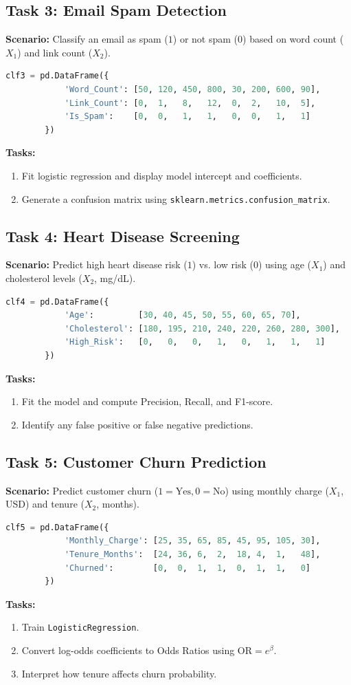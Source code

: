 \documentclass[11pt,a4paper]{article}
\begin{document}
	\subsection{Task 3: Email Spam Detection}
	\textbf{Scenario:} Classify an email as spam ($1$) or not spam ($0$) based on word count ($X_1$) and link count ($X_2$).
	\begin{lstlisting}[language=Python]
		clf3 = pd.DataFrame({
			'Word_Count': [50, 120, 450, 800, 30, 200, 600, 90],
			'Link_Count': [0,  1,   8,   12,  0,  2,   10,  5],
			'Is_Spam':    [0,  0,   1,   1,   0,  0,   1,   1]
		})
	\end{lstlisting}
	\textbf{Tasks:}
	\begin{enumerate}
		\item Fit logistic regression and display model intercept and coefficients.
		\item Generate a confusion matrix using \texttt{sklearn.metrics.confusion\_matrix}.
	\end{enumerate}
	
	\subsection{Task 4: Heart Disease Screening}
	\textbf{Scenario:} Predict high heart disease risk ($1$) vs. low risk ($0$) using age ($X_1$) and cholesterol levels ($X_2$, mg/dL).
	\begin{lstlisting}[language=Python]
		clf4 = pd.DataFrame({
			'Age':         [30, 40, 45, 50, 55, 60, 65, 70],
			'Cholesterol': [180, 195, 210, 240, 220, 260, 280, 300],
			'High_Risk':   [0,   0,   0,   1,   0,   1,   1,   1]
		})
	\end{lstlisting}
	\textbf{Tasks:}
	\begin{enumerate}
		\item Fit the model and compute Precision, Recall, and F1-score.
		\item Identify any false positive or false negative predictions.
	\end{enumerate}
	
	\subsection{Task 5: Customer Churn Prediction}
	\textbf{Scenario:} Predict customer churn ($1 = \text{Yes}, 0 = \text{No}$) using monthly charge ($X_1$, USD) and tenure ($X_2$, months).
	\begin{lstlisting}[language=Python]
		clf5 = pd.DataFrame({
			'Monthly_Charge': [25, 35, 65, 85, 45, 95, 105, 30],
			'Tenure_Months':  [24, 36, 6,  2,  18, 4,  1,   48],
			'Churned':        [0,  0,  1,  1,  0,  1,  1,   0]
		})
	\end{lstlisting}
	\textbf{Tasks:}
	\begin{enumerate}
		\item Train \texttt{LogisticRegression}.
		\item Convert log-odds coefficients to Odds Ratios using $\text{OR} = e^\beta$.
		\item Interpret how tenure affects churn probability.
	\end{enumerate}
	
\end{document}
